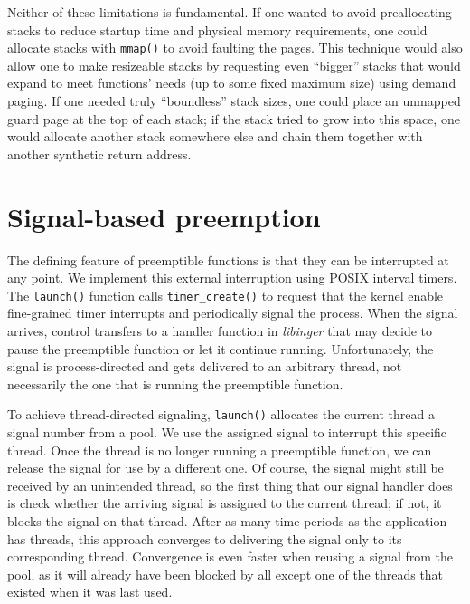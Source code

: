 Neither of these limitations is fundamental.  If one wanted to avoid preallocating
stacks to reduce startup time and physical memory requirements, one could allocate
stacks with \texttt{mmap()} to avoid faulting the pages.  This technique would also
allow one to make resizeable stacks by requesting even ``bigger'' stacks that would
expand to meet functions' needs (up to some fixed maximum size) using demand paging.
If one needed truly ``boundless'' stack sizes, one could place an unmapped guard page
at the top of each stack; if the stack tried to grow into this space, one would
allocate another stack somewhere else and chain them together with another synthetic
return address.


\section{Signal-based preemption}
\label{sec:libinger:signals}

The defining feature of preemptible functions is that they can be interrupted at any
point.  We implement this external interruption using POSIX interval timers.  The
\texttt{launch()} function calls \texttt{timer\_create()} to request that the kernel
enable fine-grained timer interrupts and periodically signal the process.  When the
signal arrives, control transfers to a handler function in \textit{libinger} that may
decide to pause the preemptible function or let it continue running.  Unfortunately,
the signal is process-directed and gets delivered to an arbitrary thread, not
necessarily the one that is running the preemptible function.

To achieve thread-directed signaling, \texttt{launch()} allocates the current thread
a signal number from a pool.  We use the assigned signal to interrupt this specific
thread.  Once the thread is no longer running a preemptible function, we can release
the signal for use by a different one.  Of course, the signal might still be received
by an unintended thread, so the first thing that our signal handler does is check
whether the arriving signal is assigned to the current thread; if not, it blocks the
signal on that thread.  After as many time periods as the application has threads,
this approach converges to delivering the signal only to its corresponding thread.
Convergence is even faster when reusing a signal from the pool, as it will already
have been blocked by all except one of the threads that existed when it was last used.

